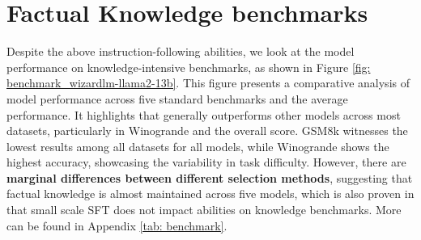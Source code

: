 \section{Factual Knowledge benchmarks}\label{sec:mitigation}



Despite the above instruction-following abilities, we look at the model performance on knowledge-intensive benchmarks, as shown in Figure \ref{fig: benchmark_wizardlm-llama2-13b}.
This figure presents a comparative analysis of model performance across five standard benchmarks and the average performance. It highlights that \two generally outperforms other models across most datasets, particularly in Winogrande and the overall score. GSM8k witnesses the lowest results among all datasets for all models, while Winogrande shows the highest accuracy, showcasing the variability in task difficulty.
However, there are \textbf{marginal differences between different selection methods}, suggesting that factual knowledge is almost maintained across five models, which is also proven in \citep{zhaolong} that small scale SFT does not impact abilities on knowledge benchmarks.
More can be found in Appendix \ref{tab: benchmark}.
 
